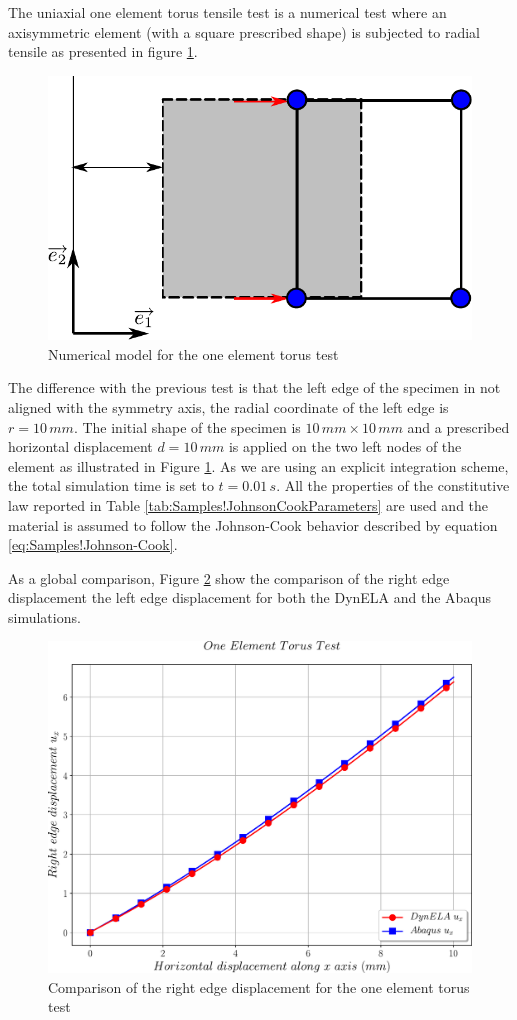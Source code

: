 The uniaxial one element torus tensile test is a numerical test where
an axisymmetric element (with a square prescribed shape) is subjected
to radial tensile as presented in figure \ref{fig:Samples!Single!Torus}.
\begin{figure}[h]
\begin{centering}
\includegraphics[width=0.5\columnwidth]{Figures/SamplesSingleTorus}
\par\end{centering}
\caption{Numerical model for the one element torus test\label{fig:Samples!Single!Torus}}
\end{figure}
 The difference with the previous test is that the left edge of the
specimen in not aligned with the symmetry axis, the radial coordinate
of the left edge is $r=10\,mm$. The initial shape of the specimen
is $10\,mm\times10\,mm$ and a prescribed horizontal displacement
$d=10\,mm$ is applied on the two left nodes of the element as illustrated
in Figure \ref{fig:Samples!Single!Torus}. As we are using an explicit
integration scheme, the total simulation time is set to $t=0.01\,s$.
All the properties of the constitutive law reported in Table \ref{tab:Samples!JohnsonCookParameters}
are used and the material is assumed to follow the Johnson-Cook behavior
described by equation \ref{eq:Samples!Johnson-Cook}.

As a global comparison, Figure \ref{fig:Samples!Single!Torus-Comparison-ux}
show the comparison of the right edge displacement \versus the left
edge displacement for both the DynELA and the Abaqus simulations.
\begin{figure}[h]
\begin{centering}
\includegraphics[width=0.5\columnwidth]{Figures/Samples/Element/Torus_dispX}
\par\end{centering}
\caption{Comparison of the right edge displacement for the one element torus
test\label{fig:Samples!Single!Torus-Comparison-ux}}
\end{figure}

